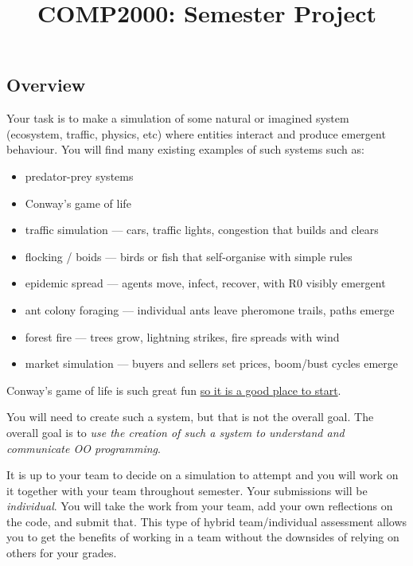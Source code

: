 \documentclass[twoside=false,DIV=14]{scrartcl}
\title{\color{redish}\vspace{-1em}COMP2000: Semester Project}
\begin{document}
{\color{blackish}\maketitle}\vspace{-7em}

\subsection*{Overview}

Your task is to make a simulation of some natural or imagined system (ecosystem, traffic, physics, etc) where entities interact and produce emergent behaviour.  You will find many existing examples of such systems such as:
\begin{itemize}
  \item predator-prey systems
  \item Conway's game of life
  \item traffic simulation --- cars, traffic lights, congestion that builds and clears
  \item flocking / boids --- birds or fish that self-organise with simple rules
  \item epidemic spread --- agents move, infect, recover, with R0 visibly emergent
  \item ant colony foraging --- individual ants leave pheromone trails, paths emerge
  \item forest fire --- trees grow, lightning strikes, fire spreads with wind
  \item market simulation --- buyers and sellers set prices, boom/bust cycles emerge
\end{itemize}

Conway's game of life is such great fun \href{https://youtu.be/rBaK4-EoF_8?si=a56O2gm5cs1a3VJB}{so it is a good place to start}.

You will need to create such a system, but that is not the overall goal.  The overall goal is to \emph{use the creation of such a system to understand and communicate OO programming}.

It is up to your team to decide on a simulation to attempt and you will work on it together with your team throughout semester.  Your submissions will be \emph{individual}.  You will take the work from your team, add your own reflections on the code, and submit that.   This type of hybrid team/individual assessment allows you to get the benefits of working in a team without the downsides of relying on others for your grades.
\end{document}
